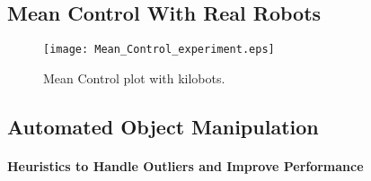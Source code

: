 \subsection{Mean Control With Real Robots}

\begin{figure}
\begin{center}
	\texttt{[image: Mean\_Control\_experiment.eps]}
\end{center}
\caption{\label{fig:realMean}
Mean Control plot with kilobots.
}
\end{figure}


\subsection{Automated Object Manipulation}
\paragraph{Heuristics to Handle Outliers and Improve Performance}


